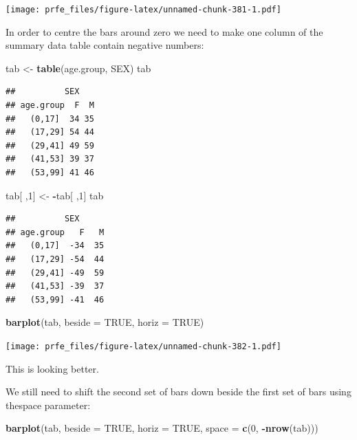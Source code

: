 \documentclass[12pt,a4paper]{book}
\newenvironment{Shaded}{\begin{snugshade}}{\end{snugshade}}
\newcommand{\DataTypeTok}[1]{\textcolor[rgb]{0.13,0.29,0.53}{#1}}
\newcommand{\DecValTok}[1]{\textcolor[rgb]{0.00,0.00,0.81}{#1}}
\newcommand{\KeywordTok}[1]{\textcolor[rgb]{0.13,0.29,0.53}{\textbf{#1}}}
\newcommand{\NormalTok}[1]{#1}
\newcommand{\OperatorTok}[1]{\textcolor[rgb]{0.81,0.36,0.00}{\textbf{#1}}}
\newcommand{\OtherTok}[1]{\textcolor[rgb]{0.56,0.35,0.01}{#1}}
\newcommand{\StringTok}[1]{\textcolor[rgb]{0.31,0.60,0.02}{#1}}
\theoremstyle{definition}
\theoremstyle{definition}
\theoremstyle{definition}
\theoremstyle{remark}
\begin{document}
\texttt{[image: prfe\_files/figure-latex/unnamed-chunk-381-1.pdf]}

In order to centre the bars around zero we need to make one column of
the summary data table contain negative numbers:

\begin{Shaded}
\begin{Highlighting}[]
\NormalTok{tab <-}\StringTok{ }\KeywordTok{table}\NormalTok{(age.group, SEX)}
\NormalTok{tab}
\end{Highlighting}
\end{Shaded}

\begin{verbatim}
##          SEX
## age.group  F  M
##   (0,17]  34 35
##   (17,29] 54 44
##   (29,41] 49 59
##   (41,53] 39 37
##   (53,99] 41 46
\end{verbatim}

\begin{Shaded}
\begin{Highlighting}[]
\NormalTok{tab[ ,}\DecValTok{1}\NormalTok{] <-}\StringTok{ }\OperatorTok{-}\NormalTok{tab[ ,}\DecValTok{1}\NormalTok{]}
\NormalTok{tab}
\end{Highlighting}
\end{Shaded}

\begin{verbatim}
##          SEX
## age.group   F   M
##   (0,17]  -34  35
##   (17,29] -54  44
##   (29,41] -49  59
##   (41,53] -39  37
##   (53,99] -41  46
\end{verbatim}

\begin{Shaded}
\begin{Highlighting}[]
\KeywordTok{barplot}\NormalTok{(tab, }\DataTypeTok{beside =} \OtherTok{TRUE}\NormalTok{, }\DataTypeTok{horiz =} \OtherTok{TRUE}\NormalTok{)}
\end{Highlighting}
\end{Shaded}

\texttt{[image: prfe\_files/figure-latex/unnamed-chunk-382-1.pdf]}

This is looking better.

We still need to shift the second set of bars down beside the first set
of bars using thespace parameter:

\begin{Shaded}
\begin{Highlighting}[]
\KeywordTok{barplot}\NormalTok{(tab, }\DataTypeTok{beside =} \OtherTok{TRUE}\NormalTok{, }\DataTypeTok{horiz =} \OtherTok{TRUE}\NormalTok{, }\DataTypeTok{space =} \KeywordTok{c}\NormalTok{(}\DecValTok{0}\NormalTok{, }\OperatorTok{-}\KeywordTok{nrow}\NormalTok{(tab)))}
\end{Highlighting}
\end{Shaded}
\end{document}
